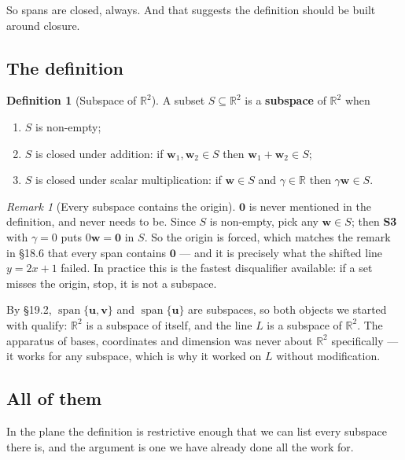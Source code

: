 \documentclass[11pt]{article}
\theoremstyle{definition}
\newtheorem{defn}{Definition}[section]
\theoremstyle{remark}
\newtheorem*{rmk}{Remark}
\newcommand{\R}{\mathbb{R}}
\newcommand{\vc}[1]{\mathbf{#1}}
\DeclareMathOperator{\spanop}{span}   %
\begin{document}
So spans are closed, always. And that suggests the definition should be built
around closure.

\subsection{The definition}
\begin{defn}[Subspace of $\R^{2}$]
A subset $S\subseteq\R^{2}$ is a \textbf{subspace} of $\R^{2}$ when
\begin{enumerate}[label=\textbf{S\arabic*.},leftmargin=3.0em,itemsep=3pt,
                  topsep=3pt]
  \item $S$ is non-empty;
  \item $S$ is closed under addition: if $\vc{w}_1,\vc{w}_2\in S$ then
        $\vc{w}_1+\vc{w}_2\in S$;
  \item $S$ is closed under scalar multiplication: if $\vc{w}\in S$ and
        $\gamma\in\R$ then $\gamma\vc{w}\in S$.
\end{enumerate}
\end{defn}

\begin{rmk}[Every subspace contains the origin]
$\vc{0}$ is never mentioned in the definition, and never needs to be. Since $S$
is non-empty, pick any $\vc{w}\in S$; then \textbf{S3} with $\gamma=0$ puts
$0\vc{w}=\vc{0}$ in $S$. So the origin is forced, which matches the remark in
\S18.6 that every span contains $\vc{0}$ --- and it is precisely what the
shifted line $y=2x+1$ failed. In practice this is the fastest disqualifier
available: if a set misses the origin, stop, it is not a subspace.
\end{rmk}

\noindent By \S19.2, $\spanop\{\vc{u},\vc{v}\}$ and $\spanop\{\vc{u}\}$ are
subspaces, so both objects we started with qualify: $\R^{2}$ is a subspace of
itself, and the line $L$ is a subspace of $\R^{2}$. The apparatus of bases,
coordinates and dimension was never about $\R^{2}$ specifically --- it works for
any subspace, which is why it worked on $L$ without modification.

\subsection{All of them}
In the plane the definition is restrictive enough that we can list every
subspace there is, and the argument is one we have already done all the work
for.
\end{document}
